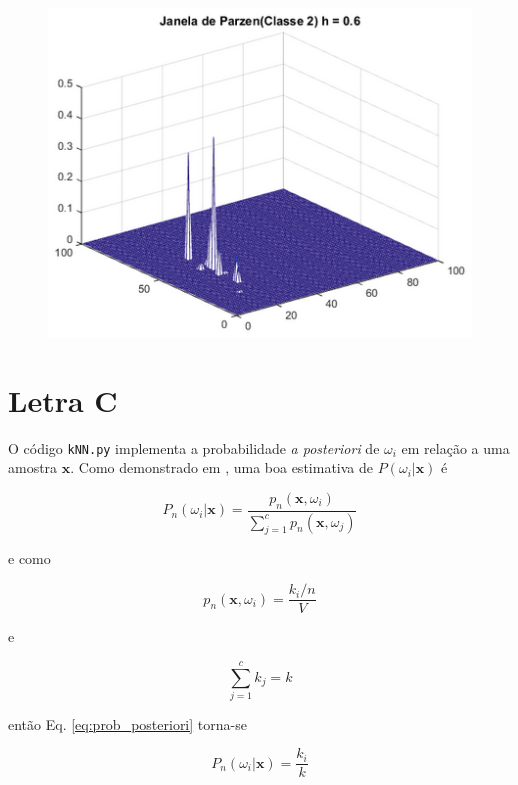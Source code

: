 \documentclass[12pt,twoside]{report}
\newcommand{\equationref}[1]{Eq. \ref{eq:#1}}
\newcommand{\code}[1]{\texttt{#1}}
\begin{document}
\begin{figure}[ht]
    \centering
    \includegraphics[scale=0.75]{parzen_c2_h06}
    \caption{}
    \label{fig:parzen_c2_h06}
\end{figure}


\section*{Letra C}

O código \code{kNN.py} implementa a probabilidade \emph{a posteriori} de $\omega_i$
em relação a uma amostra $\mathbf{x}$. Como demonstrado em \autocite{duda.hart.stork.2000},
uma boa estimativa de $P(\omega_i|\mathbf{x})$ é

\begin{equation}
P_n(\omega_i|\mathbf{x}) = \frac{p_n(\mathbf{x}, \omega_i)}{\sum_{j=1}^c p_n(\mathbf{x}, \omega_j)}
\label{eq:prob_posteriori}
\end{equation}

\noindent e como

\begin{equation}
p_n(\mathbf{x}, \omega_i) = \frac{k_i / n}{V}
\label{eq:dens_prob_conjunta}
\end{equation}

e

\begin{equation}
\sum_{j=1}^c k_j = k
\label{eq:sum_k_i}
\end{equation}

\noindent então \equationref{prob_posteriori} torna-se

\begin{equation}
P_n(\omega_i|\mathbf{x}) = \frac{k_i}{k}
\label{eq:prob_posteriori_2}
\end{equation}
\end{document}
